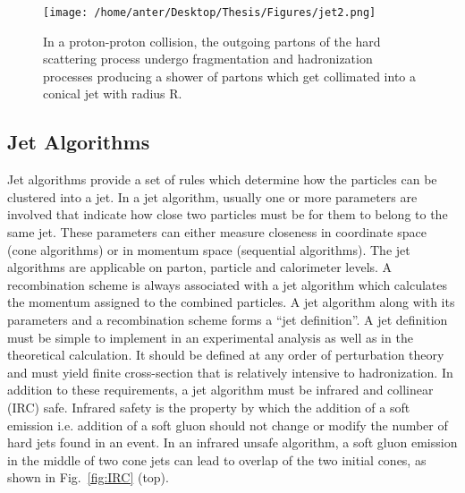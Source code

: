 \begin{figure}[!h]
\begin{center}
\hspace*{-7mm}
\texttt{[image: /home/anter/Desktop/Thesis/Figures/jet2.png]}\\
\vspace*{4mm}
\caption[Formation of a jet in a proton-proton collision.]{In a proton-proton collision, the outgoing partons of the hard scattering process undergo fragmentation and hadronization processes producing a shower of partons which get collimated into a conical jet with radius R.}
\label{fig:jet_r}
\end{center}
\end{figure}

\subsection{Jet Algorithms}
\label{sec:jet_algos}
Jet algorithms \cite{Salam:2009jx} provide a set of rules which determine how the particles can be clustered into a jet. In a jet algorithm, usually one or more parameters are involved that indicate how close two particles must be for them to belong to the same jet. These parameters can either measure closeness in coordinate space (cone algorithms) or in momentum space (sequential algorithms). The jet algorithms are applicable on parton, particle and calorimeter levels. A recombination scheme is always associated with a jet algorithm which calculates the momentum assigned to the combined particles. A jet algorithm along with its parameters and a recombination scheme forms a ``jet definition''. A jet definition \cite{Ellis:1989vm} must be simple to implement in an experimental analysis as well as in the theoretical calculation. It should be defined at any order of perturbation theory and must yield finite cross-section that is relatively intensive to hadronization. In addition to these requirements, a jet algorithm must be infrared and collinear (IRC) safe. Infrared safety is the property by which the addition of a soft emission i.e. addition of a soft gluon should not change or modify the number of hard jets found in an event. In an infrared unsafe algorithm, a soft gluon emission in the middle of two cone jets can lead to overlap of the two initial cones, as shown in Fig.~\ref{fig:IRC} (top). 
